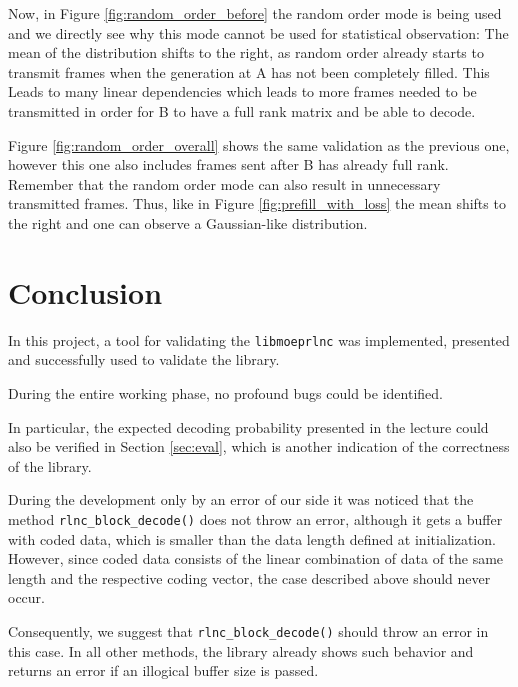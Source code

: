 \documentclass[a4paper,english,10pt]{tumarticle}
\begin{document}
Now, in Figure \ref{fig:random_order_before} the random order mode is being used and we directly see why this mode cannot be used for statistical observation: The mean of the distribution shifts to the right, as random order already starts to transmit frames when the generation at A has not been completely filled. This Leads to many linear dependencies which leads to more frames needed to be transmitted in order for B to have a full rank matrix and be able to decode.

Figure \ref{fig:random_order_overall} shows the same validation as the previous one, however this one also includes frames sent after B has already full rank. Remember that the random order mode can also result in unnecessary transmitted frames. Thus, like in Figure \ref{fig:prefill_with_loss} the mean shifts to the right and one can observe a Gaussian-like distribution.





\section{Conclusion}\label{con}
In this project, a tool for validating the \texttt{libmoeprlnc} was implemented, presented and successfully used 
to validate the library. 

During the entire working phase, no profound bugs could be identified.

In particular, the expected decoding probability presented in the lecture 
could also be verified in Section \ref{sec:eval}, which is another indication of the correctness of the library.

During the development only by an error of our side it was noticed that the method \texttt{rlnc\_block\_decode()} does not 
throw an error, although it gets a buffer with coded data, which is smaller than the data length defined 
at initialization. However, since coded data consists of the linear combination of data of the same length and 
the respective coding vector, the case described above should never occur.

Consequently, we suggest that \texttt{rlnc\_block\_decode()} should throw an error in this case. In all other methods, 
the library already shows such behavior and returns an error if an illogical buffer size is passed.
\end{document}
